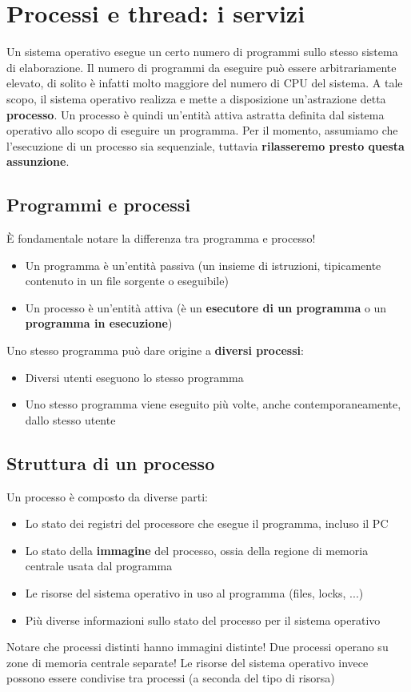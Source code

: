 \documentclass[12pt]{article}
\begin{document}
\section{Processi e thread: i servizi}
Un sistema operativo esegue un certo numero di programmi sullo stesso sistema di elaborazione.
Il numero di programmi da eseguire può essere arbitrariamente elevato, di solito è infatti molto maggiore del numero di CPU del sistema.
A tale scopo, il sistema operativo realizza e mette a disposizione un'astrazione detta \textbf{processo}. Un processo è quindi un'entità attiva astratta definita dal sistema operativo allo scopo di eseguire un programma.
Per il momento, assumiamo che l'esecuzione di un processo sia sequenziale, tuttavia \textbf{rilasseremo presto questa assunzione}.
\subsection{Programmi e processi}
È fondamentale notare la differenza tra programma e processo!
\begin{itemize}
    \item Un programma è un'entità passiva (un insieme di istruzioni, tipicamente contenuto in un file sorgente o eseguibile)
    \item Un processo è un'entità attiva (è un \textbf{esecutore di un programma} o un \textbf{programma in esecuzione})
\end{itemize}
Uno stesso programma può dare origine a \textbf{diversi processi}:
\begin{itemize}
    \item Diversi utenti eseguono lo stesso programma
    \item Uno stesso programma viene eseguito più volte, anche contemporaneamente, dallo stesso utente
\end{itemize}
\subsection{Struttura di un processo}
Un processo è composto da diverse parti:
\begin{itemize}
    \item Lo stato dei registri del processore che esegue il programma, incluso il PC
    \item Lo stato della \textbf{immagine} del processo, ossia della regione di memoria centrale usata dal programma
    \item Le risorse del sistema operativo in uso al programma (files, locks, ...)
    \item Più diverse informazioni sullo stato del processo per il sistema operativo
\end{itemize}
Notare che processi distinti hanno immagini distinte! Due processi operano su zone di memoria centrale separate!
Le risorse del sistema operativo invece possono essere condivise tra processi (a seconda del tipo di risorsa)
\end{document}
